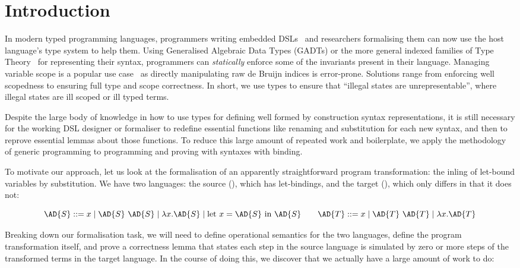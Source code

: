 
\section{Introduction}

In modern typed programming languages, programmers writing embedded
DSLs~\cite{hudak1996building} and researchers formalising them can now
use the host language's type system to help them. Using Generalised
Algebraic Data Types (GADTs) or the more general indexed families of
Type Theory~\cite{dybjer1994inductive} for representing their syntax,
programmers can \emph{statically} enforce some of the invariants
present in their language. Managing variable scope is a popular use
case~\cite{altenkirch1999monadic} as directly manipulating raw de
Bruijn indices is error-prone.  Solutions range from enforcing well
scopedness to ensuring full type and scope correctness. In short, we
use types to ensure that ``illegal states are unrepresentable'', where
illegal states are ill scoped or ill typed terms.

Despite the large body of knowledge in how to use types for defining
well formed by construction syntax representations, it is still
necessary for the working DSL designer or formaliser to redefine
essential functions like renaming and substitution for each new
syntax, and then to reprove essential lemmas about those functions. To
reduce this large amount of repeated work and boilerplate, we apply
the methodology of generic programming to programming and proving with
syntaxes with binding.

To motivate our approach, let us look at the formalisation of an
apparently straightforward program transformation: the inling of
let-bound variables by substitution. We have two languages: the source
(), which has let-bindings, and the target (), which only
differs in that it does not:

\begin{displaymath}
  \AD{S} ::= x \mid \AD{S}~\AD{S} \mid \lambda x. \AD{S} \mid \textrm{let }x=\AD{S}\textrm{ in }\AD{S}
  \qquad
  \AD{T} ::= x \mid \AD{T}~\AD{T} \mid \lambda x. \AD{T}
\end{displaymath}

Breaking down our formalisation task, we will need to define
operational semantics for the two languages, define the program
transformation itself, and prove a correctness lemma that states each
step in the source language is simulated by zero or more steps of the
transformed terms in the target language. In the course of doing this,
we discover that we actually have a large amount of work to do:

